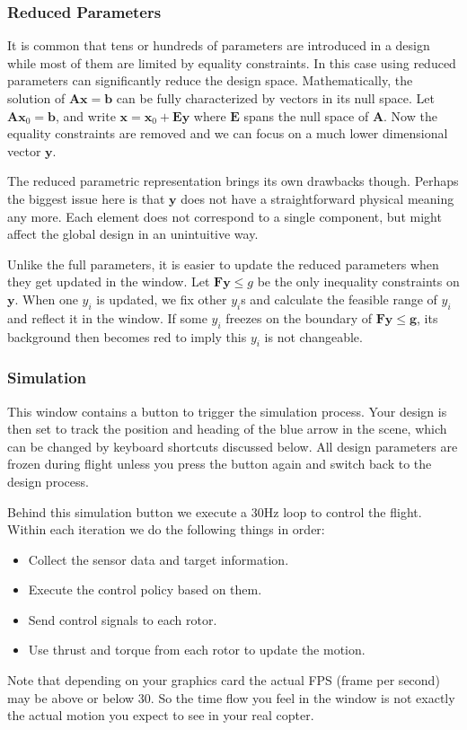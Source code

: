 \subsubsection{Reduced Parameters}
It is common that tens or hundreds of parameters are introduced in a design while most of them are limited by equality constraints. In this case using reduced parameters can significantly reduce the design space. Mathematically, the solution of $\mathbf{Ax}=\mathbf{b}$ can be fully characterized by vectors in its null space. Let $\mathbf{Ax}_0=\mathbf{b}$, and write $\mathbf{x}=\mathbf{x}_0+\mathbf{Ey}$ where $\mathbf{E}$ spans the null space of $\mathbf{A}$. Now the equality constraints are removed and we can focus on a much lower dimensional vector $\mathbf{y}$.

The reduced parametric representation brings its own drawbacks though. Perhaps the biggest issue here is that $\mathbf{y}$ does not have a straightforward physical meaning any more. Each element does not correspond to a single component, but might affect the global design in an unintuitive way.

Unlike the full parameters, it is easier to update the reduced parameters when they get updated in the window. Let $\mathbf{Fy}\leq{g}$ be the only inequality constraints on $\mathbf{y}$. When one $y_i$ is updated, we fix other $y_i$s and calculate the feasible range of $y_i$ and reflect it in the window. If some $y_i$ freezes on the boundary of $\mathbf{Fy}\leq\mathbf{g}$, its background then becomes red to imply this $y_i$ is not changeable.

\subsubsection{Simulation}
This window contains a button to trigger the simulation process. Your design is then set to track the position and heading of the blue arrow in the scene, which can be changed by keyboard shortcuts discussed below. All design parameters are frozen during flight unless you press the button again and switch back to the design process.

Behind this simulation button we execute a $30$Hz loop to control the flight. Within each iteration we do the following things in order:
\begin{itemize}
  \item Collect the sensor data and target information.

  \item Execute the control policy based on them.

  \item Send control signals to each rotor.

  \item Use thrust and torque from each rotor to update the motion.
\end{itemize}
Note that depending on your graphics card the actual FPS (frame per second) may be above or below 30. So the time flow you feel in the window is not exactly the actual motion you expect to see in your real copter.

